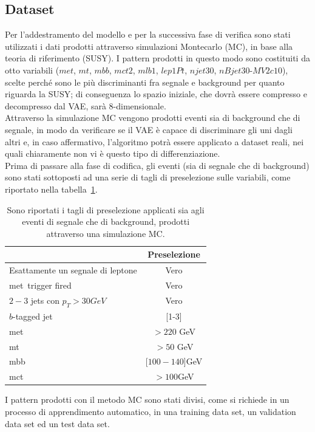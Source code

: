 \subsection{Dataset}
\label{dataset}
Per l'addestramento del modello e per la successiva fase di verifica sono stati utilizzati i dati prodotti attraverso simulazioni Montecarlo (MC), in base alla teoria di riferimento (SUSY). I pattern prodotti in questo modo sono costituiti da otto variabili ($\textit{met}$, $\textit{mt}$, $\textit{mbb}$, $\textit{mct2}$, $\textit{mlb1}$, $\textit{lep1Pt}$, $\textit{njet30}$, $\textit{nBjet30-MV2c10}$), scelte perché sono le più discriminanti fra segnale e background per quanto riguarda la SUSY; di conseguenza lo spazio iniziale, che dovrà essere compresso e decompresso dal VAE, sarà 8-dimensionale. \\
Attraverso la simulazione MC vengono prodotti eventi sia di background che di segnale, in modo da verificare se il VAE è capace di discriminare gli uni dagli altri e, in caso affermativo, l'algoritmo potrà essere applicato a dataset reali, nei quali chiaramente non vi è questo tipo di differenziazione.\\
Prima di passare alla fase di codifica, gli eventi (sia di segnale che di background) sono stati sottoposti ad una serie di tagli di preselezione sulle variabili, come riportato nella tabella~\ref{tab:tagli di preselezione}.

\begin{table}[h!]
	\centering
	\begin{tabular}{lc}
		\hline
		&Preselezione \\
		\hline
		Esattamente un segnale di leptone&Vero\\
		met\ trigger fired&Vero\\
		$2-3$ jets con $p_{T}>30 GeV$&Vero\\
		$b$-tagged jet&[1-3]\\
		met\ &$> 220$ GeV\\
		mt\ &$> 50$ GeV\\
		mbb\ &[$100-140$]GeV\\
		mct\ &$>100$GeV\\
		\hline
	\end{tabular}
	\caption{Sono riportati i tagli di preselezione applicati sia agli eventi di segnale che di background, prodotti attraverso una simulazione MC.}
	\label{tab:tagli di preselezione}
\end{table} 
I pattern prodotti con il metodo MC sono stati divisi, come si richiede in un processo di apprendimento automatico, in una training data set, un validation data set ed un test data set.
\newpage

